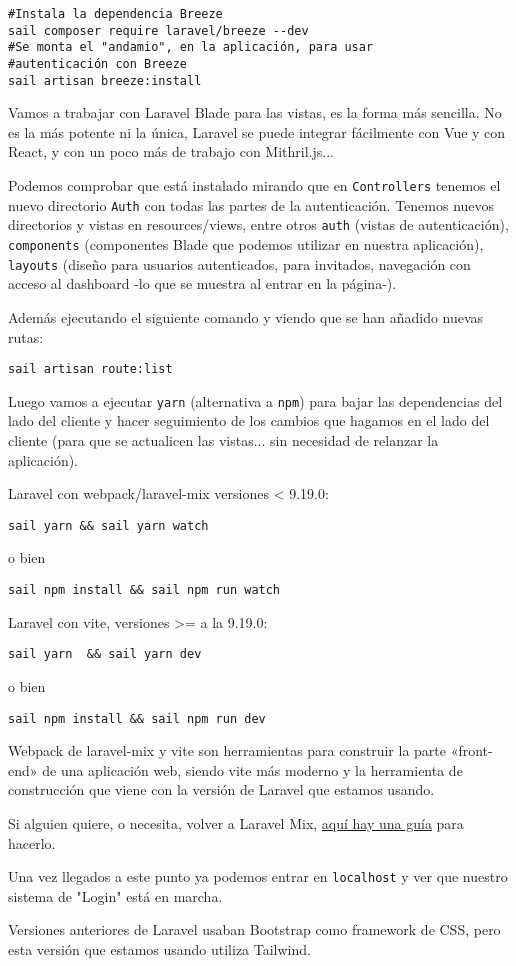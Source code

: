 \documentclass[11pt]{article}
\begin{document}
\begin{enumerate}
\begin{verbatim}
#Instala la dependencia Breeze
sail composer require laravel/breeze --dev
#Se monta el "andamio", en la aplicación, para usar
#autenticación con Breeze
sail artisan breeze:install
\end{verbatim}

Vamos a trabajar con Laravel Blade para las vistas, es la forma más
sencilla. No es la más potente ni la única, Laravel se puede integrar
fácilmente con Vue y con React, y con un poco más de trabajo con
Mithril.js...


Podemos comprobar que está instalado mirando que en \texttt{Controllers}
tenemos el nuevo directorio \texttt{Auth} con todas las partes de la
autenticación. Tenemos nuevos directorios y vistas en resources/views,
entre otros \texttt{auth} (vistas de autenticación), \texttt{components}
(componentes Blade que podemos utilizar en nuestra aplicación),
\texttt{layouts} (diseño para usuarios autenticados, para invitados,
navegación con acceso al dashboard -lo que se muestra al entrar en la
página-).

Además ejecutando el siguiente comando y viendo que se han añadido
nuevas rutas:
\begin{verbatim}
sail artisan route:list
\end{verbatim}

Luego vamos a ejecutar \texttt{yarn} (alternativa a \texttt{npm}) para bajar las
dependencias del lado del cliente y hacer seguimiento de los cambios
que hagamos en el lado del cliente (para que se actualicen las
vistas... sin necesidad de relanzar la aplicación).

Laravel con webpack/laravel-mix versiones < 9.19.0:
\begin{verbatim}
sail yarn && sail yarn watch
\end{verbatim}
o bien
\begin{verbatim}
sail npm install && sail npm run watch
\end{verbatim}

Laravel con vite, versiones >= a la 9.19.0:
\begin{verbatim}
sail yarn  && sail yarn dev
\end{verbatim}
o bien
\begin{verbatim}
sail npm install && sail npm run dev
\end{verbatim}

Webpack de laravel-mix y vite son herramientas para construir la parte
«front-end» de una aplicación web, siendo vite más moderno y la
herramienta de construcción que viene con la versión de Laravel que
estamos usando.

Si alguien quiere, o necesita, volver a Laravel Mix, \href{https://github.com/laravel/vite-plugin/blob/main/UPGRADE.md\#migrating-from-vite-to-laravel-mix}{aquí hay una guía}
para hacerlo.

Una vez llegados a este punto ya podemos entrar en \texttt{localhost} y ver
que nuestro sistema de "Login" está en marcha.

Versiones anteriores de Laravel usaban Bootstrap como framework de
CSS, pero esta versión que estamos usando utiliza Tailwind.
\end{enumerate}
\end{document}
